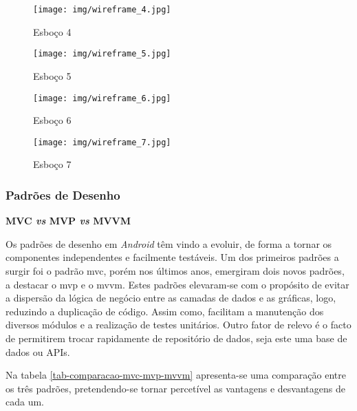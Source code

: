 \begin{figure}[H]
	\centering
	\texttt{[image: img/wireframe\_4.jpg]}
	\caption{Esboço 4}
	\label{wireframe4}
\end{figure}

\begin{figure}[H]
	\centering
	\texttt{[image: img/wireframe\_5.jpg]}
	\caption{Esboço 5}
	\label{wireframe5}
\end{figure}

\begin{figure}[H]
	\centering
	\texttt{[image: img/wireframe\_6.jpg]}
	\caption{Esboço 6}
	\label{wireframe6}
\end{figure}

\begin{figure}[H]
	\centering
	\texttt{[image: img/wireframe\_7.jpg]}
	\caption{Esboço 7}
	\label{wireframe7}
\end{figure}


\subsubsection{Padrões de Desenho}

\textbf{MVC \textit{vs} MVP \textit{vs} MVVM}

Os padrões de desenho em \textit{Android} têm vindo a evoluir, de forma a tornar os componentes independentes e facilmente testáveis. Um dos primeiros padrões a surgir foi o padrão \acrfull{mvc}, porém nos últimos anos, emergiram dois novos padrões, a destacar o \acrfull{mvp} e o \acrfull{mvvm}. Estes padrões elevaram-se com o propósito de evitar a dispersão da lógica de negócio entre as camadas de dados e as gráficas, logo, reduzindo a duplicação de código. Assim como, facilitam a manutenção dos diversos módulos e a realização de testes unitários. Outro fator de relevo é o facto de permitirem trocar rapidamente de repositório de dados, seja este uma base de dados ou APIs.

Na tabela \ref{tab-comparacao-mvc-mvp-mvvm} apresenta-se uma comparação entre os três padrões, pretendendo-se tornar percetível as vantagens e desvantagens de cada um.

